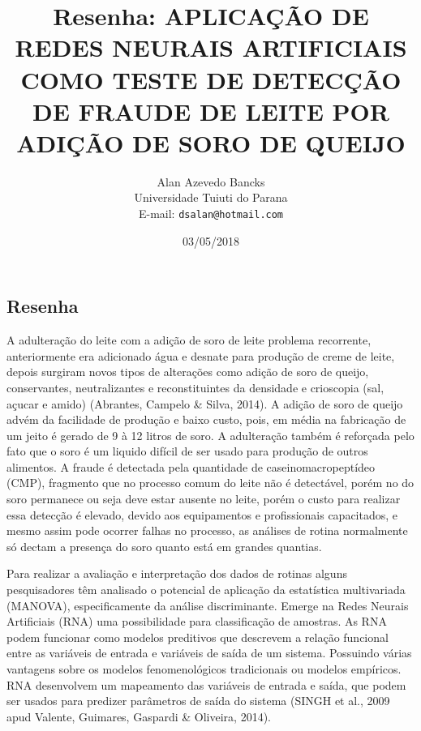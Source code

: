 \documentclass[a4paper,11pt]{article}
\title{Resenha: APLICAÇÃO DE REDES NEURAIS ARTIFICIAIS COMO TESTE DE DETECÇÃO DE FRAUDE DE LEITE POR ADIÇÃO DE SORO DE QUEIJO}
\author{Alan Azevedo Bancks \\ Universidade Tuiuti do Parana \\E-mail: {\tt dsalan@hotmail.com}}
\date{03/05/2018}
\begin{document}
\maketitle


\begin{multicols}{2}
\section{Resenha}
A adulteração do leite com a adição de soro de leite problema recorrente, anteriormente era adicionado água e desnate para produção de creme de leite, depois surgiram novos tipos de alterações como adição de soro de queijo, conservantes, neutralizantes e reconstituintes da densidade e crioscopia (sal, açucar e amido) (Abrantes, Campelo \& Silva, 2014).
A adição de soro de queijo advém da facilidade de produção e baixo custo, pois, em média na fabricação de um jeito é gerado de 9 à 12 litros de soro. A adulteração também é reforçada pelo fato que o soro é um liquido difícil de ser usado para produção de outros alimentos. A fraude é detectada pela quantidade de  caseinomacropeptídeo (CMP), fragmento que no processo comum do leite não é detectável, porém no do soro permanece ou seja deve estar ausente no leite, porém o custo para realizar essa detecção é elevado, devido aos equipamentos e profissionais capacitados, e mesmo assim pode ocorrer falhas no processo, as análises de rotina normalmente só dectam a presença do soro quanto está em grandes quantias.

Para realizar a avaliação e interpretação dos dados de rotinas alguns pesquisadores têm analisado o potencial de aplicação da estatística multivariada (MANOVA), especificamente da análise discriminante. Emerge na Redes Neurais Artificiais (RNA) uma possibilidade para classificação de amostras.  As RNA podem funcionar como modelos preditivos que descrevem a relação funcional entre as variáveis de entrada e variáveis de saída de um sistema. Possuindo várias vantagens sobre os modelos fenomenológicos tradicionais ou modelos empíricos. RNA desenvolvem um mapeamento das variáveis de entrada e saída, que podem ser usados para predizer parâmetros de saída do sistema (SINGH et al., 2009 apud Valente, Guimares, Gaspardi \& Oliveira, 2014).


\end{multicols}
\end{document}
